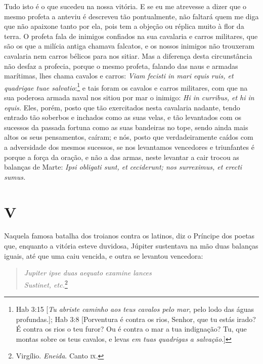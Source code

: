 Tudo isto é o que sucedeu na nossa vitória. E se eu me atrevesse a
dizer que o mesmo profeta a anteviu é descreveu tão pontualmente, não
faltará quem me diga que não apaixone tanto por ela, pois tem a objeção
ou réplica muito à flor da terra. O profeta fala de inimigos confiados
na sua cavalaria e carros militares, que são os que a milícia antiga
chamava falcatos, e os nossos inimigos não trouxeram cavalaria nem
carros bélicos para nos sitiar. Mas a diferença desta circunstância não
desfaz a profecia, porque o mesmo profeta, falando das naus e armadas
marítimas, lhes chama cavalos e carros: \emph{Viam fecisti in mari equis ruis,
et quadrigae tuae salvatio}:\footnote{Hab 3:15 [\textit{Tu abriste caminho aos teus cavalos pelo mar}, pelo lodo das águas profundas.]; Hab 3:8 [Porventura é contra os rios, Senhor, que tu estás irado? É contra os rios o teu furor? Ou é contra o mar a tua indignação? Tu, que montas sobre os teus cavalos, e levas \textit{em tuas quadrigas a salvação}.]} e tais foram os cavalos e carros
militares, com que na sua poderosa armada naval nos sitiou por mar o
inimigo: \emph{Hi in curribus, et hi in equis.} Eles, porém, posto que
tão exercitados nesta cavalaria nadante, tendo entrado tão soberbos e
inchados como as suas velas, e tão levantados com os sucessos da passada
fortuna como as suas bandeiras no tope, sendo ainda mais altos os seus
pensamentos, caíram; e nós, posto que verdadeiramente caídos com a
adversidade dos mesmos sucessos, se nos levantamos vencedores e
triunfantes é porque a força da oração, e não a das armas, neste
levantar a cair trocou as balanças de Marte: \emph{Ipsi obligati sunt,
et ceciderunt; nos surreximus, et erecti sumus.}

\section{V}

Naquela famosa batalha dos troianos contra os latinos, diz o Príncipe
dos poetas que, enquanto a vitória esteve duvidosa, Júpiter sustentava
na mão duas balanças iguais, até que uma caiu vencida, e outra se
levantou vencedora:

\begin{verse}
\emph{Jupiter ipse duas aequato examine lances}\\
\emph{Sustinet, etc.}\footnote{Virgílio. \textit{Eneida}. Canto \textsc{ix}.}
\end{verse}

